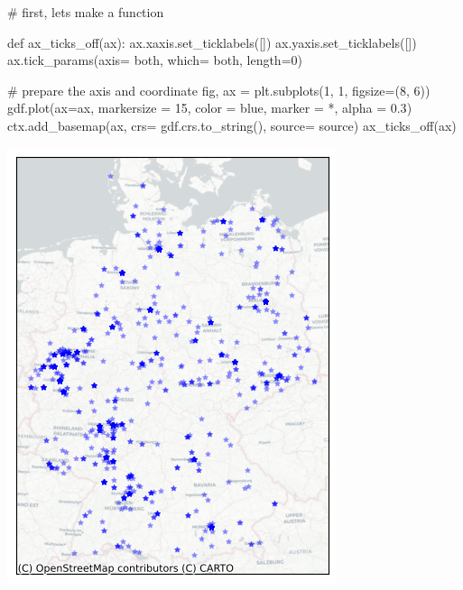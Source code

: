 \documentclass[
  letterpaper,
  DIV=11,
  numbers=noendperiod]{scrreprt}
\newenvironment{Shaded}{\begin{snugshade}}{\end{snugshade}}
\newcommand{\CommentTok}[1]{\textcolor[rgb]{0.37,0.37,0.37}{#1}}
\newcommand{\DecValTok}[1]{\textcolor[rgb]{0.68,0.00,0.00}{#1}}
\newcommand{\FloatTok}[1]{\textcolor[rgb]{0.68,0.00,0.00}{#1}}
\newcommand{\KeywordTok}[1]{\textcolor[rgb]{0.00,0.23,0.31}{#1}}
\newcommand{\NormalTok}[1]{\textcolor[rgb]{0.00,0.23,0.31}{#1}}
\newcommand{\OperatorTok}[1]{\textcolor[rgb]{0.37,0.37,0.37}{#1}}
\newcommand{\StringTok}[1]{\textcolor[rgb]{0.13,0.47,0.30}{#1}}
\begin{document}
\begin{Shaded}
\begin{Highlighting}[]
\CommentTok{\# first, let\textquotesingle{}s make a function}

\KeywordTok{def}\NormalTok{ ax\_ticks\_off(ax):}
\NormalTok{    ax.xaxis.set\_ticklabels([])}
\NormalTok{    ax.yaxis.set\_ticklabels([])}
\NormalTok{    ax.tick\_params(axis}\OperatorTok{=} \StringTok{\textquotesingle{}both\textquotesingle{}}\NormalTok{, which}\OperatorTok{=} \StringTok{\textquotesingle{}both\textquotesingle{}}\NormalTok{, length}\OperatorTok{=}\DecValTok{0}\NormalTok{)}
\end{Highlighting}
\end{Shaded}

\begin{Shaded}
\begin{Highlighting}[]
\CommentTok{\# prepare the axis and coordinate}
\NormalTok{fig, ax }\OperatorTok{=}\NormalTok{ plt.subplots(}\DecValTok{1}\NormalTok{, }\DecValTok{1}\NormalTok{, figsize}\OperatorTok{=}\NormalTok{(}\DecValTok{8}\NormalTok{, }\DecValTok{6}\NormalTok{))}
\NormalTok{gdf.plot(ax}\OperatorTok{=}\NormalTok{ax, markersize }\OperatorTok{=} \DecValTok{15}\NormalTok{, color }\OperatorTok{=} \StringTok{\textquotesingle{}blue\textquotesingle{}}\NormalTok{, marker }\OperatorTok{=} \StringTok{\textquotesingle{}*\textquotesingle{}}\NormalTok{, alpha }\OperatorTok{=} \FloatTok{0.3}\NormalTok{)}
\NormalTok{ctx.add\_basemap(ax, crs}\OperatorTok{=}\NormalTok{ gdf.crs.to\_string(), source}\OperatorTok{=}\NormalTok{ source)}
\NormalTok{ax\_ticks\_off(ax)}
\end{Highlighting}
\end{Shaded}

\includegraphics{labs/w02_maps_files/figure-pdf/cell-9-output-1.png}
\end{document}
